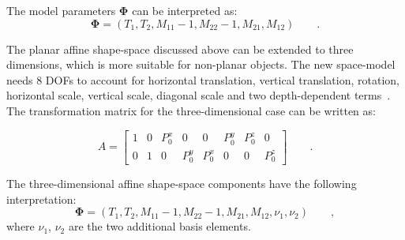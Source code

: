 The model parameters $\mathbf{\Phi}$ can be interpreted as:
\begin{equation}
  \label{eq:4.19}
  \mathbf{\Phi} =  (T_1, T_2, M_{11} - 1, M_{22} - 1, M_{21}, M_{12})\qquad.
\end{equation}

The planar affine shape-space discussed above can be extended to
three dimensions, which is more suitable for
non-planar objects. The new space-model needs 8 DOFs to
account for horizontal
translation, vertical translation, rotation, horizontal scale,
vertical scale, diagonal scale and two depth-dependent terms~\cite{blake1998active}. The transformation matrix for the three-dimensional case
can be written as:

\begin{equation}
  \label{eq:4.20}
  A =
  \begin{bmatrix}
    1 & 0 & P_0^x & 0 & 0 & P_0^y & P_0^z & 0\\
    0 & 1 & 0 & P_0^y & P_0^x & 0 & 0 & P_0^z
  \end{bmatrix} \qquad.
\end{equation}

The three-dimensional affine shape-space components have
the following interpretation:
\begin{equation}
  \label{eq:4.19}
  \mathbf{\Phi} =  (T_1, T_2, M_{11} - 1, M_{22} - 1, M_{21}, M_{12},
  \nu_1, \nu_2) \qquad,
\end{equation}
where $\nu_1$, $\nu_2$ are the two additional basis elements.
